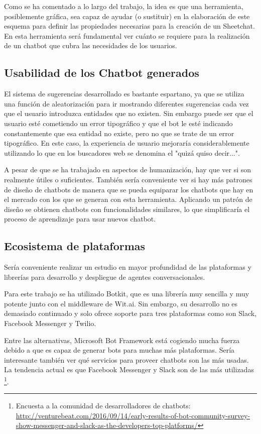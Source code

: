 Como se ha comentado a lo largo del trabajo, la idea es que una herramienta, posiblemente gráfica, sea capaz de ayudar (o sustituir) en la elaboración de este esquema para definir las propiedades necesarias para la creación de un Sheetchat. En esta herramienta será fundamental ver cuánto se requiere para la realización de un chatbot que cubra las necesidades de los usuarios.

\subsection{Usabilidad de los Chatbot generados}

El sistema de sugerencias desarrollado es bastante espartano, ya que se utiliza una función de aleatorización para ir mostrando diferentes sugerencias cada vez que el usuario introduzca entidades que no existen. Sin embargo puede ser que el usuario esté cometiendo un error tipográfico y que el bot le esté indicando constantemente que esa entidad no existe, pero no que se trate de un error tipográfico. En este caso, la experiencia de usuario mejoraría considerablemente utilizando lo que en los buscadores web se denomina el "quizá quiso decir...".

A pesar de que se ha trabajado en aspectos de humanización, hay que ver si son realmente útiles o suficientes. También sería conveniente ver si hay más patrones de diseño de chatbots de manera que se pueda equiparar los chatbots que hay en el mercado con los que se generan con esta herramienta. Aplicando un patrón de diseño se obtienen chatbots con funcionalidades similares, lo que simplificaría el proceso de aprendizaje para usar nuevos chatbot.

\subsection{Ecosistema de plataformas}

Sería conveniente realizar un estudio en mayor profundidad de las plataformas y librerías para desarrollo y despliegue de agentes conversacionales.

Para este trabajo se ha utilizado Botkit, que es una librería muy sencilla y muy potente junto con el middleware de Wit.ai. Sin embargo, su desarrollo no es demasiado continuado y solo ofrece soporte para tres plataformas como son Slack, Facebook Messenger y Twilio. 

Entre las alternativas, Microsoft Bot Framework está cogiendo mucha fuerza debido a que es capaz de generar bots para muchas más plataformas. Sería interesante también ver qué servicios para proveer chatbots son las más usadas. La tendencia actual es que Facebook Messenger y Slack son de las más utilizadas \footnote{Encuesta a la comunidad de desarrolladores de chatbots: \url{http://venturebeat.com/2016/09/14/early-results-of-bot-community-survey-show-messenger-and-slack-as-the-developers-top-platforms/}}.

